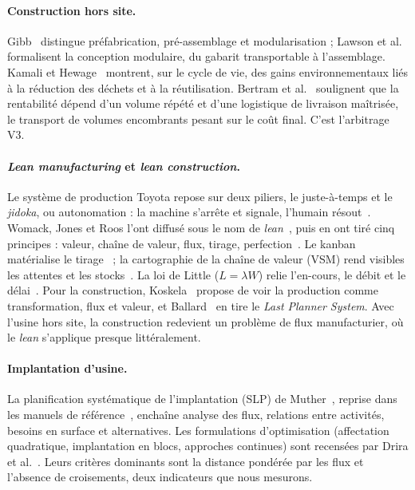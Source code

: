 \documentclass[11pt,a4paper]{article}
\begin{document}
\paragraph{Construction hors site.} Gibb~\cite{gibb1999} distingue préfabrication, pré-assemblage et
modularisation ; Lawson et al.~\cite{lawson2014} formalisent la conception modulaire, du gabarit
transportable à l'assemblage. Kamali et Hewage~\cite{kamali2016} montrent, sur le cycle de vie,
des gains environnementaux liés à la réduction des déchets et à la réutilisation. Bertram et
al.~\cite{bertram2019} soulignent que la rentabilité dépend d'un volume répété et d'une logistique
de livraison maîtrisée, le transport de volumes encombrants pesant sur le coût final. C'est
l'arbitrage V3.

\paragraph{\emph{Lean manufacturing} et \emph{lean construction}.} Le système de production Toyota
repose sur deux piliers, le juste-à-temps et le \emph{jidoka}, ou autonomation : la machine s'arrête
et signale, l'humain résout~\cite{ohno1988}. Womack, Jones et Roos l'ont diffusé sous le nom de
\emph{lean}~\cite{womack1990}, puis en ont tiré cinq principes : valeur, chaîne de valeur, flux,
tirage, perfection~\cite{womack1996}. Le kanban matérialise le tirage~\cite{sugimori1977} ; la
cartographie de la chaîne de valeur (VSM) rend visibles les attentes et les
stocks~\cite{rother1999}. La loi de Little ($L = \lambda W$) relie l'en-cours, le débit et le
délai~\cite{little1961,hopp2008}. Pour la construction, Koskela~\cite{koskela1992} propose de voir
la production comme transformation, flux et valeur, et Ballard~\cite{ballard2000} en tire le
\emph{Last Planner System}. Avec l'usine hors site, la construction redevient un problème de flux
manufacturier, où le \emph{lean} s'applique presque littéralement.

\paragraph{Implantation d'usine.} La planification systématique de l'implantation (SLP) de
Muther~\cite{muther1961}, reprise dans les manuels de référence~\cite{tompkins2010}, enchaîne
analyse des flux, relations entre activités, besoins en surface et alternatives. Les formulations
d'optimisation (affectation quadratique, implantation en blocs, approches continues) sont
recensées par Drira et al.~\cite{drira2007}. Leurs critères dominants sont la distance pondérée
par les flux et l'absence de croisements, deux indicateurs que nous mesurons.
\end{document}
